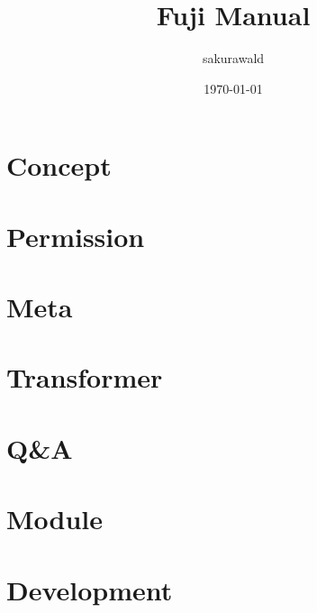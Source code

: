 \documentclass[10pt,oneside]{book}
\begin{document}
    \title{Fuji Manual}
    \author{sakurawald}
    \date{\today\\\version}

    \maketitle
    \tableofcontents


    \mainmatter


    \chapter{Concept}\label{ch:concept}
    


    \chapter{Permission}\label{ch:permission}
    


    \chapter{Meta}\label{ch:meta}
    


    \chapter{Transformer}\label{ch:transformer}
    


    \chapter{Q\&A}\label{ch:q&a}
    


    \chapter{Module}\label{ch:module}
    

    \chapter{Development}\label{ch:development}
    
\end{document}
